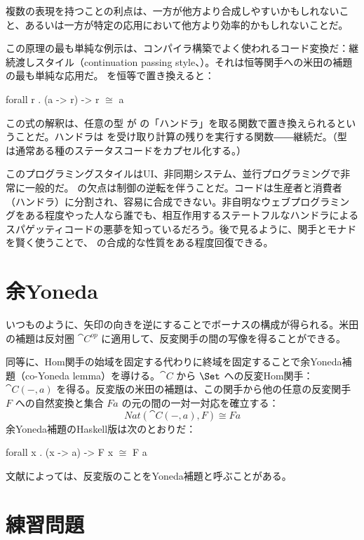 複数の表現を持つことの利点は、一方が他方より合成しやすいかもしれないこと、あるいは一方が特定の応用において他方より効率的かもしれないことだ。

この原理の最も単純な例示は、コンパイラ構築でよく使われるコード変換だ：継続渡しスタイル（continuation passing style、）。それは恒等関手への米田の補題の最も単純な応用だ。 を恒等で置き換えると：

\begin{snipv}
forall r . (a -> r) -> r \ensuremath{\cong} a
\end{snipv}
この式の解釈は、任意の型  が  の「ハンドラ」を取る関数で置き換えられるということだ。ハンドラは  を受け取り計算の残りを実行する関数――継続だ。（型  は通常ある種のステータスコードをカプセル化する。）

このプログラミングスタイルはUI、非同期システム、並行プログラミングで非常に一般的だ。 の欠点は制御の逆転を伴うことだ。コードは生産者と消費者（ハンドラ）に分割され、容易に合成できない。非自明なウェブプログラミングをある程度やった人なら誰でも、相互作用するステートフルなハンドラによるスパゲッティコードの悪夢を知っているだろう。後で見るように、関手とモナドを賢く使うことで、 の合成的な性質をある程度回復できる。

\section{余Yoneda}

いつものように、矢印の向きを逆にすることでボーナスの構成が得られる。米田の補題は反対圏 $\cat{C}^\mathit{op}$ に適用して、反変関手の間の写像を得ることができる。

同等に、Hom関手の始域を固定する代わりに終域を固定することで余Yoneda補題（co-Yoneda lemma）を導ける。$\cat{C}$ から $\Set$ への反変Hom関手：$\cat{C}(-, a)$ を得る。反変版の米田の補題は、この関手から他の任意の反変関手 $F$ への自然変換と集合 $F a$ の元の間の一対一対応を確立する：
\[\mathit{Nat}(\cat{C}(-, a), F) \cong F a\]
余Yoneda補題のHaskell版は次のとおりだ：

\begin{snipv}
forall x . (x -> a) -> F x \ensuremath{\cong} F a
\end{snipv}
文献によっては、反変版のことをYoneda補題と呼ぶことがある。

\section{練習問題}

